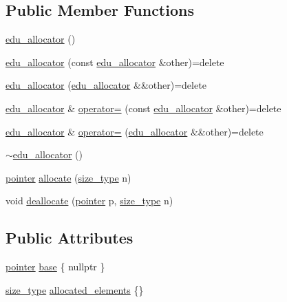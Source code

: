 \subsection*{Public Member Functions}
\begin{DoxyCompactItemize}
\item 
\hyperlink{classedu__allocator_a1f4ffbfc259ed45c33bf568d4d80c77e}{edu\+\_\+allocator} ()
\item 
\hyperlink{classedu__allocator_a8bb03f4289b7490b96d62852a462bfc5}{edu\+\_\+allocator} (const \hyperlink{classedu__allocator}{edu\+\_\+allocator} \&other)=delete
\item 
\hyperlink{classedu__allocator_a1568fb6d6d3eba994495c6c36c9bd316}{edu\+\_\+allocator} (\hyperlink{classedu__allocator}{edu\+\_\+allocator} \&\&other)=delete
\item 
\hyperlink{classedu__allocator}{edu\+\_\+allocator} \& \hyperlink{classedu__allocator_a74205dc4ce395a099bb364e84ddb023e}{operator=} (const \hyperlink{classedu__allocator}{edu\+\_\+allocator} \&other)=delete
\item 
\hyperlink{classedu__allocator}{edu\+\_\+allocator} \& \hyperlink{classedu__allocator_af56502a382e898432e5c0a1e42e61e96}{operator=} (\hyperlink{classedu__allocator}{edu\+\_\+allocator} \&\&other)=delete
\item 
\hyperlink{classedu__allocator_ac7e2dd1dab8e21c3e8d98fc389e1b19f}{$\sim$edu\+\_\+allocator} ()
\item 
\hyperlink{classedu__allocator_a735857fd1d42cae69aef990a62e597cf}{pointer} \hyperlink{classedu__allocator_a024665ef87c08fb1e9a3fda489ef496e}{allocate} (\hyperlink{classedu__allocator_aa140c3e2a9364dcbc207fa148b5c1deb}{size\+\_\+type} n)
\item 
void \hyperlink{classedu__allocator_a4536512dd171e8fb38bed090aa964f34}{deallocate} (\hyperlink{classedu__allocator_a735857fd1d42cae69aef990a62e597cf}{pointer} p, \hyperlink{classedu__allocator_aa140c3e2a9364dcbc207fa148b5c1deb}{size\+\_\+type} n)
\end{DoxyCompactItemize}
\subsection*{Public Attributes}
\begin{DoxyCompactItemize}
\item 
\hyperlink{classedu__allocator_a735857fd1d42cae69aef990a62e597cf}{pointer} \hyperlink{classedu__allocator_ac589cfa71f123e6e4e78a0f648235a9a}{base} \{ nullptr \}
\item 
\hyperlink{classedu__allocator_aa140c3e2a9364dcbc207fa148b5c1deb}{size\+\_\+type} \hyperlink{classedu__allocator_ae6cb130b199afb8e9c2a555508ff88d6}{allocated\+\_\+elements} \{\}
\end{DoxyCompactItemize}


